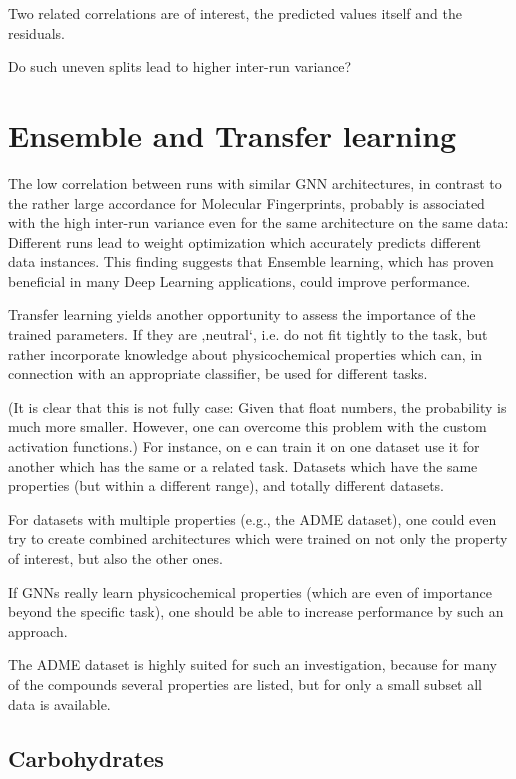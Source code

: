 Two related correlations are of interest, the predicted values itself and the residuals. 

Do such uneven splits lead to higher inter-run variance?

\section{Ensemble and Transfer learning}

The low correlation between runs with similar GNN architectures, in contrast to the rather large accordance for Molecular Fingerprints, probably is associated with the high inter-run variance even for the same architecture on the same data: Different runs lead to weight optimization which accurately predicts different data instances. This finding suggests that Ensemble learning, which has proven beneficial in many Deep Learning applications, could improve performance.

Transfer learning yields another opportunity to assess the importance of the trained parameters.
If they are ‚neutral‘, i.e. do not fit tightly to the task, but rather incorporate knowledge about physicochemical properties which can, in connection with an appropriate classifier, be used for different tasks.

(It is clear that this is not fully case: Given that float numbers, the probability is much more smaller. However, one can overcome this problem with the custom activation functions.)
For instance, on e can train it on one dataset use it for another which has the same or a related task.
Datasets which have the same properties (but within a different range), and totally different datasets.

For datasets with multiple properties (e.g., the ADME dataset), one could even try to create combined architectures which were trained on not only the property of interest, but also the other ones.

If GNNs really learn physicochemical properties (which are even of importance beyond the specific task), one should be able to increase performance by such an approach.

The ADME dataset is highly suited for such an investigation, because for many of the compounds several properties are listed, but for only a small subset all data is available.

\subsection{Carbohydrates}


